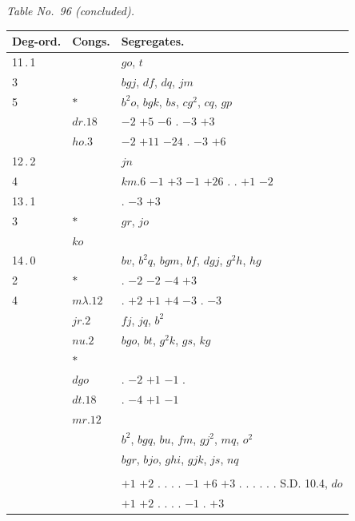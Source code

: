 \documentclass[11pt]{article}
\begin{document}

\begin{center}
\textit{Table No.\ 96 (concluded).}
\end{center}

\begin{center}
\begin{tabular}{lll}
Deg-ord. & Congs. & Segregates. \\
\hline
11\,.\,1 & & $go$, $t$ \\
3 & & $bgj$, $df$, $dq$, $jm$ \\
5 & $*$ & $b^{2}o$, $bgk$, $bs$, $cg^{2}$, $cq$, $gp$ \\
& $dr.18$ & $-2$ $+5$ $-6$ \quad . \quad $-3$ $+3$ \\
& $ho.3$ & $-2$ $+11$ $-24$ \quad . \quad $-3$ $+6$ \\
12\,.\,2 & & $jn$ \\
4 & & $km.6$ \quad $-1$ $+3$ $-1$ $+26$ \quad . \quad . \quad $+1$ $-2$ \\
13\,.\,1 & & . \quad $-3$ $+3$ \\
3 & $*$ & $gr$, $jo$ \\
& $ko$ & \\
14\,.\,0 & & $bv$, $b^{2}q$, $bgm$, $bf$, $dgj$, $g^{2}h$, $hg$ \\
2 & $*$ & . \quad $-2$ $-2$ $-4$ $+3$ \\
4 & $m\lambda.12$ & . \quad $+2$ $+1$ $+4$ $-3$ \quad . \quad $-3$ \\
& $jr.2$ & $fj$, $jq$, $b^{2}$ \\
& $nu.2$ & $bgo$, $bt$, $g^{2}k$, $gs$, $kg$ \\
& $*$ & \\
& $dgo$ & . \quad $-2$ $+1$ $-1$ . \\
& $dt.18$ & . \quad $-4$ \quad\quad $+1$ $-1$ \\
& $mr.12$ & \\
& & $b^{2}$, $bgq$, $bu$, $fm$, $gj^{2}$, $mq$, $o^{2}$ \\
& & $bgr$, $bjo$, $ghi$, $gjk$, $js$, $nq$ \\
& & \\
& & $+1$ $+2$ \quad . \quad . \quad . \quad . \quad $-1$ $+6$ $+3$ \quad . \quad . \quad . \quad . \quad . \quad . S.D. 10.4, $do$ \\
& & $+1$ $+2$ \quad . \quad . \quad . \quad . \quad $-1$ \quad . \quad $+3$ \\
\end{tabular}
\end{center}
\end{document}
